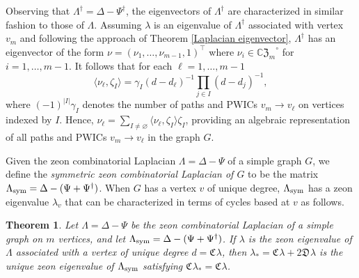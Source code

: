 \documentclass{article}
\newtheorem{theorem}{Theorem}[section]
\theoremstyle{definition}
\newcommand{\zco}{\mathfrak{C}\mspace{1mu}}
\newcommand{\zdu}{\mathfrak{D}\mspace{1mu}}
\newcommand{\CZ}{\mathbb{C}\mathfrak{Z}}
\numberwithin{equation}{section}
\begin{document}
Observing that $\Lambda^\dag=\Delta-\Psi^\dag$, the eigenvectors of $\Lambda^\dag$ are characterized in similar fashion to those of $\Lambda$.  Assuming $\lambda$ is an eigenvalue of $\Lambda^\dag$ associated with vertex $v_m$ and following the approach of Theorem \ref{Laplacian eigenvector}, $\Lambda^\dag$ has an eigenvector of the form $\nu=(\nu_1, \ldots,  \nu_{m-1}, 1)^\intercal$ where $\nu_i\in{\CZ_m}^\circ$ for $i=1, \ldots, m-1$.  It follows that for each $\ell=1, \ldots, m-1$\begin{equation}\label{eigenvector characterization 2}
\langle \nu_\ell, \zeta_I\rangle=\gamma_I(d-d_\ell)^{-1}\prod_{j\in I}(d-d_j)^{-1},
\end{equation}
where $(-1)^{|I|}\gamma_I$ denotes the number of paths and PWICs $v_m\to v_\ell$ on vertices indexed by $I$.  Hence,  $\nu_\ell=\displaystyle\sum_{I\ne\varnothing}\langle \nu_\ell, \zeta_I\rangle\zeta_I$, providing an algebraic representation of all paths and PWICs $v_m\to v_\ell$ in the graph $G$.


Given the zeon combinatorial Laplacian $\Lambda=\Delta-\Psi$ of a simple graph $G$, we define the {\em symmetric zeon combinatorial Laplacian of $G$} to be the matrix $\Lambda_{\rm sym}=\Delta-(\Psi+\Psi^\dag)$.  When $G$ has a vertex $v$ of unique degree,  $\Lambda_{\rm sym}$ has a zeon eigenvalue $\lambda_v$ that can be characterized in terms of cycles based at $v$ as follows. 

\begin{theorem}\label{Lambda_sym eigenvalue}
Let $\Lambda=\Delta-\Psi$ be the zeon combinatorial Laplacian of a simple graph on $m$ vertices, and let $\Lambda_{\rm sym}=\Delta-(\Psi+\Psi^\dag)$.  If $\lambda$ is the zeon eigenvalue of $\Lambda$ associated with a vertex of unique degree $d=\zco\lambda$, then $\lambda_*=\zco\lambda+2\zdu \lambda$ is the unique zeon eigenvalue of $\Lambda_{\rm sym}$ satisfying $\zco\lambda_*=\zco\lambda$.  
\end{theorem}
\end{document}
